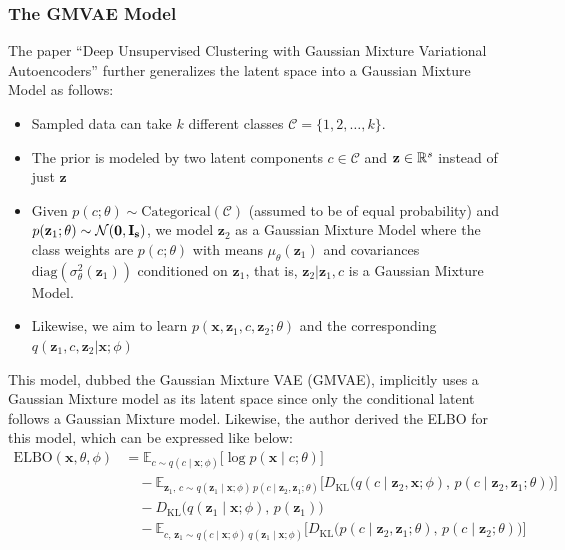 \subsubsection{The GMVAE Model}
The paper ``Deep Unsupervised Clustering with Gaussian Mixture Variational Autoencoders'' \cite{gmvae} further generalizes the latent space into a Gaussian Mixture Model as follows:
\begin{itemize}
    \item Sampled data can take $k$ different classes $\mathcal{C}=\{1,2,\dots,k\}$.
    \item The prior is modeled by two latent components $c\in\mathcal{C}$ and $\mathbf{z}\in\mathbb{R}^s$ instead of just $\mathbf{z}$
    \item Given $p(c;\theta)\sim\text{Categorical}(\mathcal{C})$ (assumed to be of equal probability) and $p(\mathbf{z}_1;\theta)\sim\mathcal{N}(\mathbf{0},\mathbf{I_s})$, we model $\mathbf{z}_2$ as a Gaussian Mixture Model where the class weights are $p(c;\theta)$ with means $\mu_\theta(\mathbf{z}_1)$ and covariances $\text{diag}(\sigma^2_\theta(\mathbf{z}_1))$ conditioned on $\mathbf{z}_1$, that is, $\mathbf{z}_2|\mathbf{z}_1,c$ is a Gaussian Mixture Model.
    \item Likewise, we aim to learn $p(\mathbf{x},\mathbf{z}_1,c,\mathbf{z}_2;\theta)$ and the corresponding $q(\mathbf{z}_1,c,\mathbf{z}_2|\mathbf{x};\phi)$
\end{itemize}
This model, dubbed the Gaussian Mixture VAE (GMVAE), implicitly uses a Gaussian Mixture model as its latent space since only the conditional latent follows a Gaussian Mixture model. Likewise, the author derived the ELBO for this model, which can be expressed like below:
\begin{align*}
    \mathrm{ELBO}(\mathbf{x},\theta,\phi)
    &= \mathbb{E}_{c \sim q(c \mid \mathbf{x}; \phi)}\bigl[\log p(\mathbf{x} \mid c; \theta)\bigr] \\[6pt]
    &\quad
    - \mathbb{E}_{\mathbf{z}_1,\,c \sim q(\mathbf{z}_1 \mid \mathbf{x}; \phi)\,p(c \mid \mathbf{z}_2,\mathbf{z}_1; \theta)}
    \bigl[D_{\mathrm{KL}}\bigl(q(c \mid \mathbf{z}_2,\mathbf{x}; \phi),\,p(c \mid \mathbf{z}_2,\mathbf{z}_1; \theta)\bigr)\bigr] \\[6pt]
    &\quad
    - D_{\mathrm{KL}}\bigl(q(\mathbf{z}_1 \mid \mathbf{x}; \phi),\,p(\mathbf{z}_1)\bigr) \\[6pt]
    &\quad
    - \mathbb{E}_{c,\,\mathbf{z}_1 \sim q(c \mid \mathbf{x}; \phi)\,q(\mathbf{z}_1 \mid \mathbf{x}; \phi)}
    \bigl[D_{\mathrm{KL}}\bigl(p(c \mid \mathbf{z}_2,\mathbf{z}_1; \theta),\,p(c \mid \mathbf{z}_2; \theta)\bigr)\bigr]
\end{align*}
